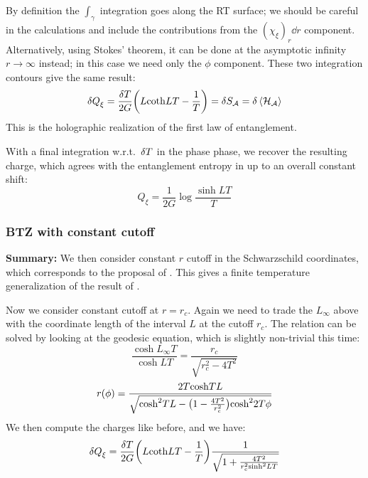 \documentclass[11pt,a4paper]{article}
\begin{document}
	By definition the $\int_\gamma$ integration goes along the RT surface; we should be careful in the calculations and include the contributions from the $(\chi_\xi)_r \dd{r}$ component. 
	Alternatively, using Stokes' theorem, it can be done at the asymptotic infinity $r\to\infty$ instead; in this case we need only the $\phi$ component. These two integration contours give the same result:
	\begin{equation}
		\var{Q}_\xi
		= \frac{\var{T}}{2G} \pqty{
				L \coth LT - \frac{1}{T}
			}
		= \var{S_\mcal{A}}
		= \var{\ave{\mcal{H}_\mcal{A}}}
	\end{equation}
	This is the holographic realization of the first law of entanglement. 
	
	
	With a final integration w.r.t.~$\var{T}$ in the phase phase, we recover the resulting charge, which agrees with the entanglement entropy in \cite{Rangamani:2016dms} up to an overall constant shift:
	\begin{equation}
		Q_\xi = \frac{1}{2G} \log \frac{\sinh LT}{T}
	\end{equation}
	
\pagebreak
\subsubsection{BTZ with constant cutoff}
\textbf{Summary:} We then consider constant $r$ cutoff in the Schwarzschild coordinates, which corresponds to the proposal of \cite{McGough:2016lol}. This gives a finite temperature generalization of the result of \cite{Lewkowycz:2019xse}. 

	Now we consider constant cutoff at $r = r_c$. Again we need to trade the $L_\infty$ above with the coordinate length of the interval $L$ at the cutoff $r_c$. The relation can be solved by looking at the geodesic equation, which is slightly non-trivial this time:
	\begin{equation}
		\frac{\cosh L_\infty T}{\cosh LT}
		= \frac{r_c}{\sqrt{r_c^2 - 4T^2}}
	\end{equation}
	\begin{equation}
		r(\phi) = \frac{2T\cosh TL}{
				\sqrt{\cosh^2 TL - \pqty\big{
					1 - \frac{4T^2}{r_c^2}
				}\cosh^2 2T\phi}
			}
	\end{equation}
	We then compute the charges like before, and we have:
	\begin{equation}
		\var{Q}_\xi
		= \frac{\var{T}}{2G} \pqty{
				L \coth LT - \frac{1}{T}
			}
			\frac{1}{\sqrt{
				1 + \frac{4T^2}{r_c^2 \sinh^2 LT}
			}}
	\end{equation}
	
\end{document}
